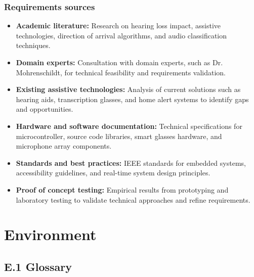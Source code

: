 \documentclass[12pt]{article}
\theoremstyle{definition}
\begin{document}
\subsubsection{Requirements sources}

\begin{itemize}
\item \textbf{Academic literature:} Research on hearing loss impact, assistive
technologies, direction of arrival algorithms, and audio classification
techniques.

\item \textbf{Domain experts:}\label{itm:domain-experts} Consultation with
domain experts, such as Dr. Mohrenschildt, for technical feasibility and
requirements validation.

\item \textbf{Existing assistive technologies:} Analysis of current solutions
such as hearing aids, transcription glasses, and home alert systems to identify
gaps and opportunities.

\item \textbf{Hardware and software documentation:} Technical specifications for
microcontroller, source code libraries, smart glasses hardware, and microphone
array components.

\item \textbf{Standards and best practices:} IEEE standards for embedded
systems, accessibility guidelines, and real-time system design principles.

\item \textbf{Proof of concept testing:} Empirical results from prototyping and
laboratory testing to validate technical approaches and refine requirements.
\end{itemize}


\section{Environment}

\subsection{E.1 Glossary}
\end{document}
